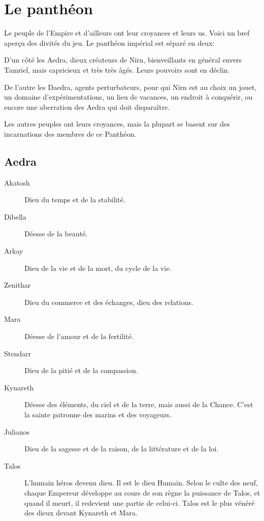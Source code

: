 
\chapter{Le panthéon}

Le peuple de l'Empire et d'ailleurs ont leur croyances et leurs us. Voici un bref aperçu des divités du jeu. Le panthéon impérial est séparé en deux: 

D'un côté les Aedra, dieux créateurs de Nirn, bienveillants en général envers Tamriel, mais capricieux et très très âgés. Leurs pouvoirs sont en déclin.

De l'autre les Daedra, agents perturbateurs, pour qui Nirn est au choix un jouet, un domaine d'expérimentations, un lieu de vacances, un endroit à conquérir, ou encore une aberration des Aedra qui doit disparaître.

Les autres peuples ont leurs croyances, mais la plupart se basent sur des incarnations des membres de ce Panthéon.

\section{Aedra}

\begin{description}
\item[Akatosh]
{
  Dieu du temps et de la stabilité.
}
\item[Dibella]
{
  Déesse de la beauté.
}
\item[Arkay]
{
  Dieu de la vie et de la mort, du cycle de la vie.
}
\item[Zenithar]
{
  Dieu du commerce et des échanges, dieu des relations.
}
\item[Mara]
{
  Déesse de l'amour et de la fertilité.
}
\item[Stendarr]
{
  Dieu de la pitié et de la compassion.
}
\item[Kynareth]
{
  Déesse des éléments, du ciel et de la terre, mais aussi de la Chance. C'est la sainte patronne des marins et des voyageurs.
}
\item[Julianos]
{
  Dieu de la sagesse et de la raison, de la littérature et de la loi.
}
\item[Talos]
{
  L'humain héros devenu dieu. Il est le dieu Humain. Selon le culte des neuf, chaque Empereur développe au cours de son règne la puissance de Talos, et quand il meurt, il redevient une partie de celui-ci. Talos est le plus vénéré des dieux devant Kynareth et Mara.
}
\end{description}

